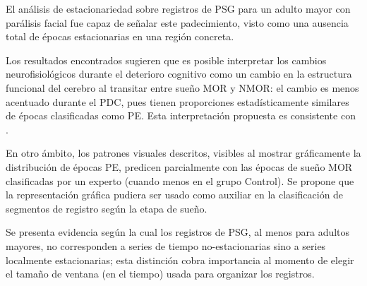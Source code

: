 \documentclass[12pt,a4paper]{mitthesis}
\begin{document}
El an\'alisis de estacionariedad sobre registros de PSG para un adulto mayor con 
par\'alisis facial fue capaz de se\~nalar este padecimiento, visto 
como una ausencia total de \'epocas estacionarias
en una regi\'on concreta.



Los resultados encontrados sugieren que es posible interpretar los cambios 
neurofisiol\'ogicos durante el deterioro cognitivo como un cambio en la 
estructura funcional del cerebro al
transitar entre sue\~no MOR y NMOR: el cambio es menos acentuado durante el PDC, pues tienen 
proporciones estad\'isticamente similares de \'epocas clasificadas como PE.
Esta interpretaci\'on propuesta es consistente con \cite{Valeria}.

En otro \'ambito, los patrones visuales descritos, visibles al mostrar gr\'aficamente la 
distribuci\'on de \'epocas PE, predicen parcialmente con las \'epocas de sue\~no MOR clasificadas 
por un experto (cuando menos en el grupo Control).
Se propone que la representaci\'on gr\'afica pudiera ser usado como auxiliar en la clasificaci\'on 
de segmentos de registro seg\'un la etapa de sue\~no.

Se presenta evidencia seg\'un la cual los registros de PSG, al menos para adultos mayores, no 
corresponden a series de tiempo no-estacionarias sino a series localmente estacionarias; esta 
distinci\'on cobra importancia al momento de elegir el tama\~no de ventana (en el tiempo) usada 
para organizar los registros.


\end{document}
